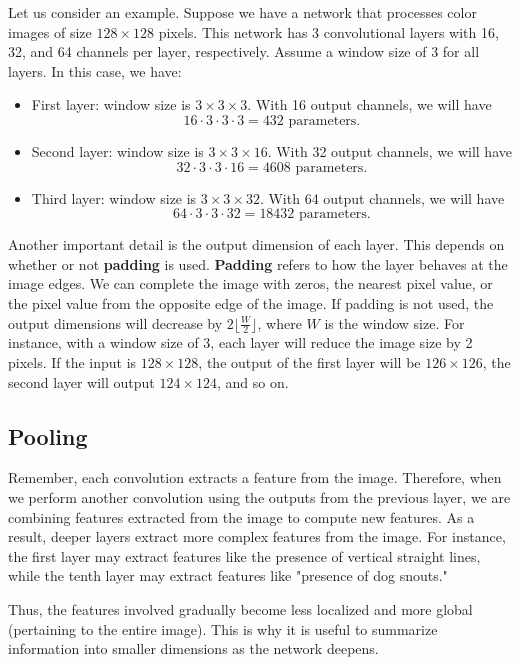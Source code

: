 Let us consider an example. Suppose we have a network that processes color images of size \( 128 \times 128 \) pixels. This network has 3 convolutional layers with 16, 32, and 64 channels per layer, respectively. Assume a window size of 3 for all layers. In this case, we have:

\begin{itemize}
    \item First layer: window size is \( 3 \times 3 \times 3 \). With 16 output channels, we will have 
    \[
    16 \cdot 3 \cdot 3 \cdot 3 = 432 \text{ parameters.}
    \]
    \item Second layer: window size is \( 3 \times 3 \times 16 \). With 32 output channels, we will have 
    \[
    32 \cdot 3 \cdot 3 \cdot 16 = 4608 \text{ parameters.}
    \]
    \item Third layer: window size is \( 3 \times 3 \times 32 \). With 64 output channels, we will have 
    \[
    64 \cdot 3 \cdot 3 \cdot 32 = 18432 \text{ parameters.}
    \]
\end{itemize}


Another important detail is the output dimension of each layer. This depends on whether or not \textbf{padding} is used. \textbf{Padding} refers to how the layer behaves at the image edges. We can complete the image with zeros, the nearest pixel value, or the pixel value from the opposite edge of the image. If padding is not used, the output dimensions will decrease by \( 2 \lfloor \frac{W}{2} \rfloor \), where \( W \) is the window size. For instance, with a window size of 3, each layer will reduce the image size by 2 pixels. If the input is \( 128 \times 128 \), the output of the first layer will be \( 126 \times 126 \), the second layer will output \( 124 \times 124 \), and so on.

\subsection{Pooling}

Remember, each convolution extracts a feature from the image. Therefore, when we perform another convolution using the outputs from the previous layer, we are combining features extracted from the image to compute new features. As a result, deeper layers extract more complex features from the image. For instance, the first layer may extract features like the presence of vertical straight lines, while the tenth layer may extract features like "presence of dog snouts."

Thus, the features involved gradually become less localized and more global (pertaining to the entire image). This is why it is useful to summarize information into smaller dimensions as the network deepens.

